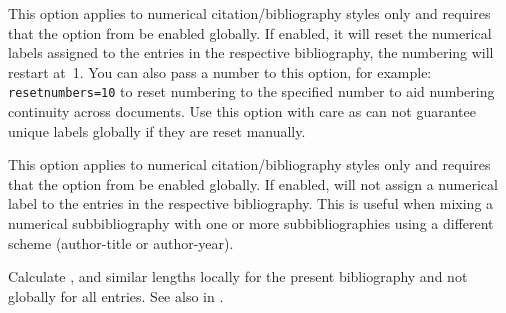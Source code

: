 \documentclass{ltxdockit}[2011/03/25]
\newcommand*{\biblatex}{\sty{biblatex}\xspace}
\begin{document}
\begin{optionlist*}

This option applies to numerical citation\slash bibliography styles only and requires that the  option from  be enabled globally. If enabled, it will reset the numerical labels assigned to the entries in the respective bibliography, \ie the numbering will restart at~1. You can also pass a number to this option, for example: \texttt{resetnumbers=10} to reset numbering to the specified number to aid numbering continuity across documents. Use this option with care as \biblatex can not guarantee unique labels globally if they are reset manually.


This option applies to numerical citation\slash bibliography styles only and requires that the  option from  be enabled globally. If enabled, \biblatex will not assign a numerical label to the entries in the respective bibliography. This is useful when mixing a numerical subbibliography with one or more subbibliographies using a different scheme (\eg author-title or author-year).


Calculate ,  and similar lengths locally for the present bibliography and not globally for all entries. See also  in .

\end{optionlist*}
\end{document}
